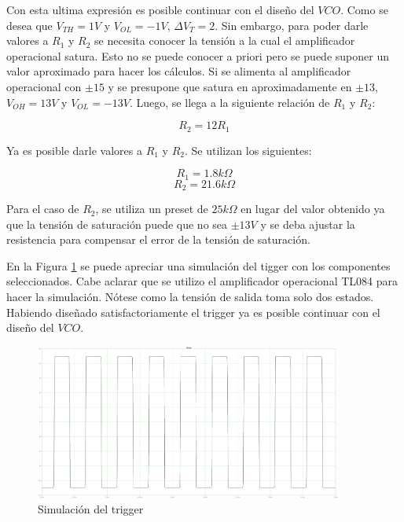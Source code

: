  


Con esta ultima expresión es posible continuar con el diseño del $VCO$. Como se desea que $V_{TH} = 1V$ y $V_{OL} = -1V$, $\Delta V_T = 2$. Sin embargo, para poder darle valores a $R_1$ y $R_2$ se necesita conocer la tensión a la cual el amplificador operacional satura. Esto no se puede conocer a priori pero se puede suponer un valor aproximado para hacer los cálculos. Si se alimenta al amplificador operacional con $\pm 15$ y se presupone que satura en aproximadamente en $\pm 13$, $V_{OH} = 13V$ y $V_{OL} = -13V$. Luego, se llega a la siguiente relación de $R_1$ y $R_2$:

\begin{equation}
    R_2 = 12 R_1
    \label{eq:R_1yR_2}
\end{equation}

Ya es posible darle valores a $R_1$ y $R_2$. Se utilizan los siguientes:

\begin{displaymath}
    R_1 = 1.8k \Omega
\end{displaymath}
\begin{displaymath}
    R_2 = 21.6k \Omega
\end{displaymath}

Para el caso de $R_2$, se utiliza un preset de $25k\Omega$ en lugar del valor obtenido ya que la tensión de saturación puede que no sea $\pm 13V$ y se deba ajustar la resistencia para compensar el error de la tensión de saturación. 

En la Figura \ref{fig:sim_trigger} se puede apreciar una simulación del tigger con los componentes seleccionados. Cabe aclarar que se utilizo el amplificador operacional TL084 para hacer la simulación. Nótese como la tensión de salida toma solo dos estados. Habiendo diseñado satisfactoriamente el trigger ya es posible continuar con el diseño del $VCO$.


\begin{figure}[h!]                                                       
    \centering\includegraphics[width=0.9\textwidth]{../Ex3/Resources/sim_trigger.png}
    \caption{Simulación del trigger}
    \label{fig:sim_trigger}
    \end{figure}


